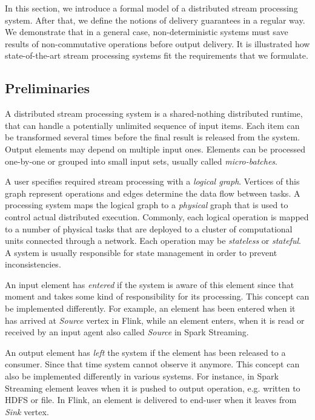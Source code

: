 \label{fs-formalism}

In this section, we introduce a formal model of a distributed stream processing system. After that, we define the notions of delivery guarantees in a regular way. We demonstrate that in a general case, non-deterministic systems must save results of non-commutative operations before output delivery. It is illustrated how state-of-the-art stream processing systems fit the requirements that we formulate.

\subsection{Preliminaries}

A distributed stream processing system is a shared-nothing distributed runtime, that can handle a potentially unlimited sequence of input items. Each item can be transformed several times before the final result is released from the system. Output elements may depend on multiple input ones. Elements can be processed one-by-one or grouped into small input sets, usually called {\em micro-batches}. 

A user specifies required stream processing with a {\em logical graph}. Vertices of this graph represent operations and edges determine the data flow between tasks. A processing system maps the logical graph to a {\em physical} graph that is used to control actual distributed execution. Commonly, each logical operation is mapped to a number of physical tasks that are deployed to a cluster of computational units connected through a network. Each operation may be {\em stateless} or {\em stateful}. A system is usually responsible for state management in order to prevent inconsistencies.

An input element has {\em entered} if the system is aware of this element since that moment and takes some kind of responsibility for its processing. 
This concept can be implemented differently. 
For example,
 an  element has been entered when  it  has arrived at {\em Source} vertex in Flink, while   
an element enters, when it is read or received by an input agent also called  {\em Source}   in Spark Streaming.

An output element has {\em left} the system if the element has been released to a consumer. 
Since that time system cannot observe it anymore. This concept can also be implemented differently in various systems. For instance, in Spark Streaming element leaves when it is pushed to output operation, e.g. written to HDFS or file. In Flink, an element is delivered to end-user when it leaves from {\em Sink} vertex.   

